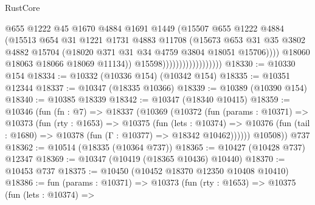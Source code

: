 \begin{lexlean}{RustCore}
\begin{coremodule}
                                            @655
                                            @1222
                                            @45
                                            @1670
                                            @4884
                                            @1691
                                            @1449
                                            (@15507
                                              @655
                                              @1222
                                              @4884
                                              (@15513
                                                @654
                                                @31
                                                @1221
                                                @1731
                                                @4883
                                                @11708
                                                (@15673
                                                  @653
                                                  @31
                                                  @35
                                                  @3802
                                                  @4882
                                                  @15704
                                                  (@18020 @371 @31 @34 @4759 @3804 @18051 @15706))))
                                            @18060
                                            @18063
                                            @18066
                                            @18069
                                            @11134))
                                        @15598))))))))))))))))))
@18330 := @10330 @154
@18334 := @10332 (@10336 @154) (@10342 @154)
@18335 := @10351 @12344
@18337 := @10347 (@18335 @10366)
@18339 := @10389 (@10390 @154)
@18340 := @10385 @18339
@18342 := @10347 (@18340 @10415)
@18359 := @10346
    (fun (fn : @7) =>
    @18337
      (@10369
        (@10372
          (fun (params : @10371) =>
          @10373
            (fun (rty : @1653) =>
            @10375
              (fun (lets : @10374) =>
              @10376 (fun (tail : @1680) => @10378 (fun (Γ : @10377) => @18342 @10462))))))
        @10508))
    @737
@18362 := @10514 (@18335 (@10364 @737))
@18365 := @10427 (@10428 @737) @12347
@18369 := @10347 (@10419 (@18365 @10436) @10440)
@18370 := @10453 @737
@18375 := @10450 (@10452 @18370 @12350 @10408 @10410)
@18386 := fun (params : @10371) =>
  @10373
    (fun (rty : @1653) =>
    @10375
      (fun (lets : @10374) =>

\end{coremodule}
\end{lexlean}
